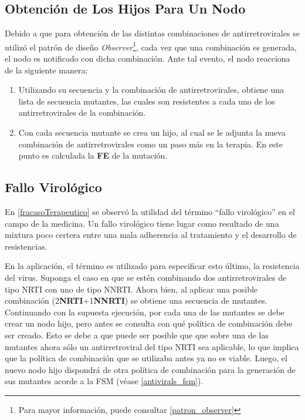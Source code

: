 \subsection{Obtenci\'on de Los Hijos Para Un Nodo}
Debido a que para obtenci\'on de las distintas combinaciones de antirretrovirales se utiliz\'o el patr\'on de dise\~no \textit{Observer}\footnote{Para
mayor informaci\'on, puede consultar \ref{patron_observer}}, cada vez que una combinaci\'on es generada, el nodo es notificado con dicha combinaci\'on.
Ante tal evento, el nodo reacciona de la siguiente manera:
\begin{enumerate}
  \item  Utilizando su secuencia y la combinaci\'on de antirretrovirales, obtiene una lista de secuencia mutantes, las cuales son resistentes a cada uno
    de los antirretrovirales de la combinaci\'on.
  \item  Con cada secuencia mutante se crea un hijo, al cual se le adjunta la nueva combinaci\'on de antirretrovirales como un paso m\'as en la terapia.
    En este punto es calculada la \textbf{FE} de la mutaci\'on.
\end{enumerate}
 
\subsection{Fallo Virol\'ogico}
En \ref{fracasoTerapeutico} se observ\'o la utilidad del t\'ermino ``fallo virol\'ogico'' en el campo de la medicina. Un fallo virol\'ogico tiene
lugar como resultado de una mixtura poco certera entre una mala adherencia al tratamiento y el desarrollo de resistencias.

En la aplicaci\'on, el t\'ermino es utilizado para especificar esto \'ultimo, la resistencia del virus. Suponga el caso en que se est\'en
combinando dos antirretrovirales de tipo NRTI con uno de tipo NNRTI. Ahora bien, al aplicar una posible combinaci\'on (2\textbf{NRTI}+1\textbf{NNRTI})
se obtiene una secuencia de mutantes. Continuando con la supuesta ejecuci\'on, por cada una de las mutantes se debe crear un nodo hijo, pero antes se
consulta con qu\'e pol\'itica de combinaci\'on debe ser creado. Esto se debe a que puede ser posible que que sobre una de las mutantes ahora s\'olo un
antirretroviral del tipo NRTI sea aplicable, lo que implica que la pol\'itica de combinaci\'on que se utilizaba antes ya no es viable. Luego, el
nuevo nodo hijo dispondr\'a de otra pol\'itica de combinaci\'on para la generaci\'on de sus mutantes acorde a la FSM (v\'ease \ref{antivirals_fsm}).

